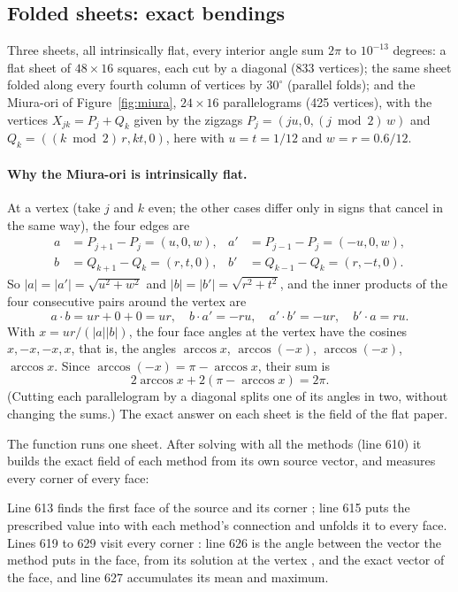\subsection{Folded sheets: exact bendings}

Three sheets, all intrinsically flat, every interior angle sum $2\pi$ to $10^{-13}$ degrees: a flat sheet of $48 \times 16$ squares, each cut by a diagonal (833 vertices); the same sheet folded along every fourth column of vertices by $30^\circ$ (parallel folds); and the Miura-ori of Figure~\ref{fig:miura}, $24 \times 16$ parallelograms (425 vertices), with the vertices $X_{jk} = P_j + Q_k$ given by the zigzags $P_j = (j u, 0, (j \bmod 2)\, w)$ and $Q_k = ((k \bmod 2)\, r, k t, 0)$, here with $u = t = 1/12$ and $w = r = 0.6/12$.

\paragraph{Why the Miura-ori is intrinsically flat.} At a vertex (take $j$ and $k$ even; the other cases differ only in signs that cancel in the same way), the four edges are
\begin{equation*}
\begin{aligned}
a &= P_{j+1} - P_j = (u, 0, w), & a' &= P_{j-1} - P_j = (-u, 0, w), \\
b &= Q_{k+1} - Q_k = (r, t, 0), & b' &= Q_{k-1} - Q_k = (r, -t, 0).
\end{aligned}
\end{equation*}
So $|a| = |a'| = \sqrt{u^2 + w^2}$ and $|b| = |b'| = \sqrt{r^2 + t^2}$, and the inner products of the four consecutive pairs around the vertex are
\begin{equation*}
a\cdot b = ur + 0 + 0 = ur, \quad b\cdot a' = -ru, \quad a'\cdot b' = -ur, \quad b'\cdot a = ru .
\end{equation*}
With $x = ur/(|a||b|)$, the four face angles at the vertex have the cosines $x, -x, -x, x$, that is, the angles $\arccos x$, $\arccos(-x)$, $\arccos(-x)$, $\arccos x$. Since $\arccos(-x) = \pi - \arccos x$, their sum is
\begin{equation*}
2\arccos x + 2(\pi - \arccos x) = 2\pi .
\end{equation*}
(Cutting each parallelogram by a diagonal splits one of its angles in two, without changing the sums.) The exact answer on each sheet is the field of the flat paper.

The function  runs one sheet. After solving with all the methods (line 610) it builds the exact field of each method from its own source vector, and measures every corner of every face:

Line 613 finds the first face  of the source and its corner ; line 615 puts the prescribed value into  with each method's connection and unfolds it to every face. Lines 619 to 629 visit every corner : line 626 is the angle between the vector the method puts in the face, from its solution  at the vertex , and the exact vector of the face, and line 627 accumulates its mean and maximum.

